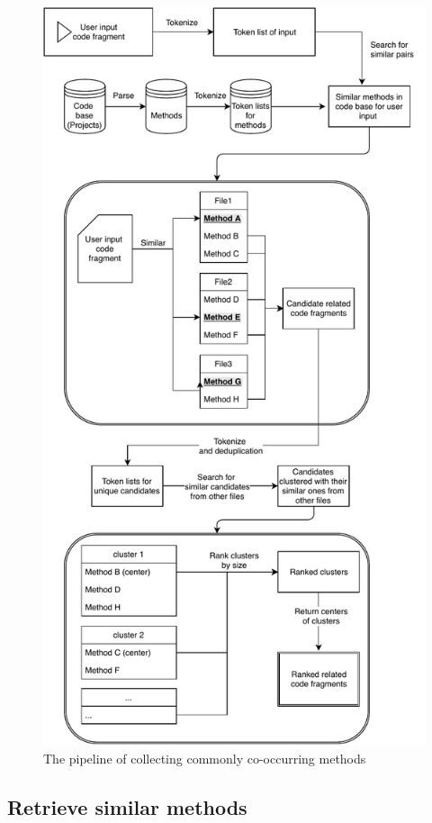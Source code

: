 \begin{figure}
	\includegraphics[width=\linewidth]{figures/pipeline.pdf}
	\caption{The pipeline of collecting commonly co-occurring methods}
	\label{fig:pipeline}
\end{figure}

\subsection{Retrieve similar methods}
